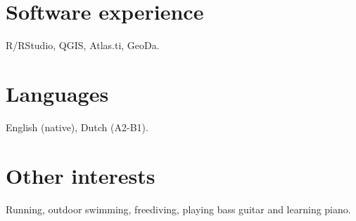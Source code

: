 \documentclass[10pt,a4paper,]{article}
\begin{document}
\hypertarget{software-experience}{%
\section{Software experience}\label{software-experience}}

R/RStudio, QGIS, Atlas.ti, GeoDa.

\hypertarget{languages}{%
\section{Languages}\label{languages}}

English (native), Dutch (A2-B1).

\hypertarget{other-interests}{%
\section{Other interests}\label{other-interests}}

Running, outdoor swimming, freediving, playing bass guitar and learning
piano.
\end{document}
